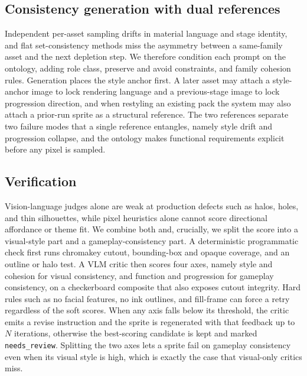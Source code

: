 \documentclass{article}
\begin{document}
\subsection{Consistency generation with dual references}
\label{sec:generation}

Independent per-asset sampling drifts in material language and stage identity, and flat
set-consistency methods miss the asymmetry between a same-family asset and the next depletion
step.
We therefore condition each prompt on the ontology, adding role class, preserve and avoid
constraints, and family cohesion rules.
Generation places the style anchor first.
A later asset may attach a style-anchor image to lock rendering language and a previous-stage
image to lock progression direction, and when restyling an existing pack the system may also
attach a prior-run sprite as a structural reference.
The two references separate two failure modes that a single reference entangles, namely style
drift and progression collapse, and the ontology makes functional requirements explicit before
any pixel is sampled.

\subsection{Verification}
\label{sec:critic}

Vision-language judges alone are weak at production defects such as halos, holes, and thin
silhouettes, while pixel heuristics alone cannot score directional affordance or theme fit.
We combine both and, crucially, we split the score into a visual-style part and a
gameplay-consistency part.
A deterministic programmatic check first runs chromakey cutout, bounding-box and opaque coverage,
and an outline or halo test.
A VLM critic then scores four axes, namely style and cohesion for visual consistency, and function
and progression for gameplay consistency, on a checkerboard composite that also exposes cutout
integrity.
Hard rules such as no facial features, no ink outlines, and fill-frame can force a retry
regardless of the soft scores.
When any axis falls below its threshold, the critic emits a revise instruction and the sprite is
regenerated with that feedback up to \(N\) iterations, otherwise the best-scoring candidate is
kept and marked \texttt{needs\_review}.
Splitting the two axes lets a sprite fail on gameplay consistency even when its visual style is
high, which is exactly the case that visual-only critics miss.

\end{document}
